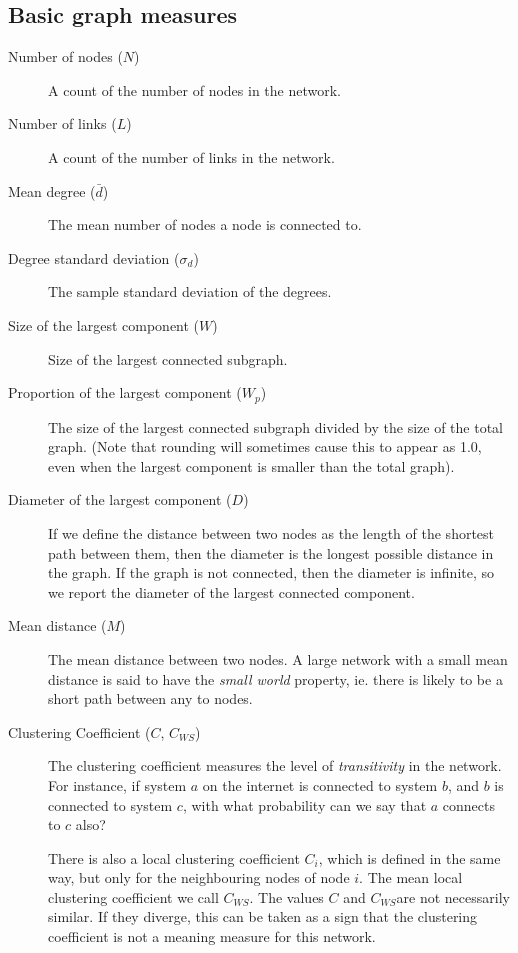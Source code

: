 \documentclass{article}
\theoremstyle{definition}
\begin{document}
\subsection*{Basic graph measures}
\begin{description}
\item[Number of nodes ($N$)] A count of the number of nodes in the network.
\item[Number of links ($L$)] A count of the number of links in the network. 
\item[Mean degree ($\bar{d}$)] The mean number of nodes a node is connected to.
\item[Degree standard deviation ($\sigma_d$)] The sample standard deviation of the degrees.
\item[Size of the largest component ($W$)] Size of the largest connected subgraph.
\item[Proportion of the largest component ($W_p$)] The size of the largest connected subgraph divided by the size of the total graph. (Note that rounding will sometimes cause this to appear as 1.0, even when the largest component is smaller than the total graph).
\item[Diameter of the largest component ($D$)] If we define the distance between two nodes as the length of the shortest path between them, then the diameter is the longest possible distance in the graph. If the graph is not connected, then the diameter is infinite, so we report the diameter of the largest connected component.  
\item[Mean distance ($M$)] The mean distance between two nodes. A large network with a small mean distance is said to have the \textit{small world} property, ie. there is likely to be a short path between any to nodes.
\item[Clustering Coefficient ($C$, $C_{WS}$)] The clustering coefficient measures the level of \textit{transitivity} in the network. For instance, if system $a$ on the internet is connected to system $b$, and $b$ is connected to system $c$, with what probability can we say that $a$ connects to $c$ also?

There is also a local clustering coefficient $C_i$, which is defined in the same way, but only for the neighbouring nodes of node $i$. The mean local clustering coefficient we call $C_{WS}$. The values $C$ and $C_{WS}$are not necessarily similar. If they diverge, this can be taken as a sign that the clustering coefficient is not a meaning measure for this network.\cite{newman2010networks}
\end{description}
\end{document}
